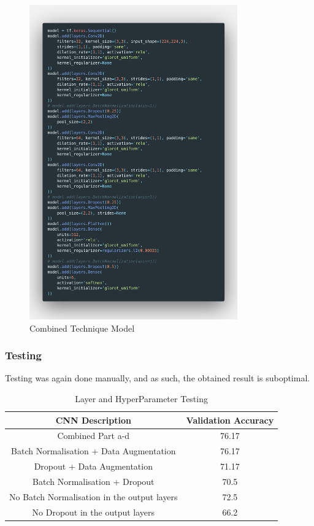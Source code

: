 \begin{figure}[H]
	\centering
	\includegraphics[width=0.8\textwidth]{images/Code/combo}
	\caption{Combined Technique Model}
	\label{fig:images-Code-combo}
\end{figure}

\subsubsection{Testing}

Testing was again done manually, and as such, the obtained result is suboptimal.

\begin{table}[H]
	\centering
	\caption{Layer and HyperParameter Testing}
	\label{tab:q1pe}
	\begin{tabular}{|c|c|}
	\hline
	CNN Description & Validation Accuracy \\
	\hline
	Combined Part a-d & 76.17 \\
	Batch Normalisation + Data Augmentation & 76.17 \\
	Dropout + Data Augmentation & 71.17 \\
	Batch Normalisation + Dropout & 70.5 \\
	No Batch Normalisation in the output layers & 72.5 \\
	No Dropout in the output layers & 66.2 \\
	\hline
	\end{tabular}
\end{table}

